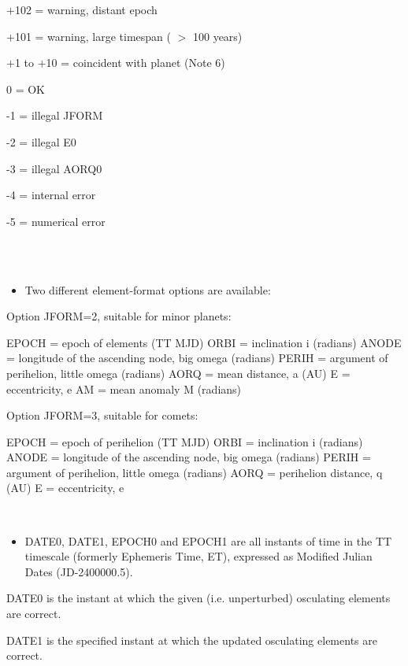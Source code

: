 \documentclass[twoside,11pt]{article}
\renewcommand{\_}{\texttt{\symbol{95}}}
\newcommand{\sstnotes}[1]{\goodbreak \item[Notes:] \mbox{} \\[1.3ex] #1}
\newcommand{\sstitemlist}[1]{
  \mbox{} \\
  \vspace{-3.5ex}
  \begin{itemize}
     #1
  \end{itemize}
}
\newcommand{\sstitem}{\item}
\newcommand{\sstnotes}[1]{\item[Notes:] #1 }
\newcommand{\sstitemlist}[1]{
      \begin{itemize}
         #1
      \end{itemize}
      \\
   }
\newcommand{\sstitem}{\item}
\begin{document}
{{{{            \sstitem
              $+$102 = warning, distant epoch

            \sstitem
              $+$101 = warning, large timespan ( $>$ 100 years)

            \sstitem
              $+$1 to $+$10 = coincident with planet (Note 6)

            \sstitem
              0 = OK

            \sstitem
              -1 = illegal JFORM

            \sstitem
              -2 = illegal E0

            \sstitem
              -3 = illegal AORQ0

            \sstitem
              -4 = internal error

            \sstitem
              -5 = numerical error
         }
      }
   }
   \sstnotes{
      \sstitemlist{

         \sstitem
         Two different element-format options are available:

      }
        Option JFORM=2, suitable for minor planets:

        EPOCH   = epoch of elements (TT MJD)
        ORBI    = inclination i (radians)
        ANODE   = longitude of the ascending node, big omega (radians)
        PERIH   = argument of perihelion, little omega (radians)
        AORQ    = mean distance, a (AU)
        E       = eccentricity, e
        AM      = mean anomaly M (radians)

        Option JFORM=3, suitable for comets:

        EPOCH   = epoch of perihelion (TT MJD)
        ORBI    = inclination i (radians)
        ANODE   = longitude of the ascending node, big omega (radians)
        PERIH   = argument of perihelion, little omega (radians)
        AORQ    = perihelion distance, q (AU)
        E       = eccentricity, e

      \sstitemlist{

         \sstitem
         DATE0, DATE1, EPOCH0 and EPOCH1 are all instants of time in
           the TT timescale (formerly Ephemeris Time, ET), expressed
           as Modified Julian Dates (JD-2400000.5).

      }
        DATE0 is the instant at which the given (i.e. unperturbed)
        osculating elements are correct.

        DATE1 is the specified instant at which the updated osculating
        elements are correct.

}}
\end{document}
